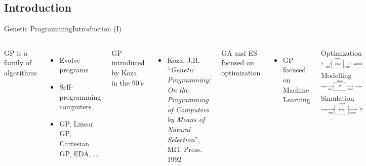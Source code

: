 \documentclass[10pt,compress]{beamer} %
\begin{document}
\subsection{Introduction}
\begin{frame}{Genetic Programming}{Introduction (I)}
    \begin{columns}
	GP is a family of algorithms
	\begin{itemize}
		\item Evolve programs
		\item Self-programming computers
		\item GP, Linear GP, Cartesian GP, EDA, ...
	\end{itemize}

	GP introduced by Koza in the 90's
	\begin{itemize}
		\item[] \small{Koza, J.R.  ``\textit{Genetic Programming: On the Programming of Computers by Means of Natural Selection}'', MIT Press. 1992}
	\end{itemize}

	GA and ES focused on optimization
	\begin{itemize}
		\item GP focused on Machine Learning
	\end{itemize}
	   \begin{center}
	   Optimization\\
	\includegraphics[width=\linewidth]{figs/optimization.eps}\\\bigskip
		Modelling\\
	\includegraphics[width=\linewidth]{figs/modelling.eps}\\\bigskip
		Simulation\\
	\includegraphics[width=\linewidth]{figs/simulation.eps}\\
	\end{center}
	   \end{columns}
\end{frame}
\end{document}
